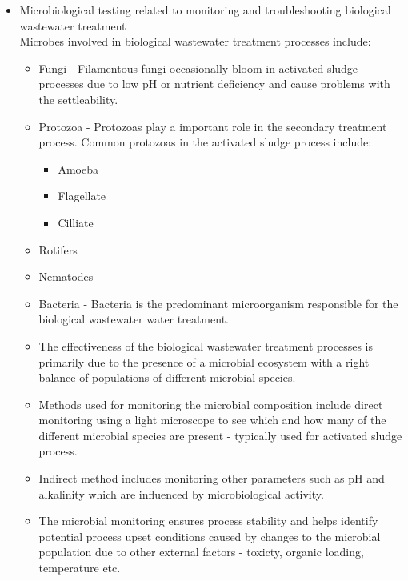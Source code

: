 \begin{itemize}
				
				\item Microbiological testing related to monitoring and troubleshooting biological wastewater treatment\\
				
				Microbes involved in biological wastewater treatment processes include:\\
				\begin{itemize}
					\item Fungi - Filamentous fungi occasionally bloom in activated sludge processes due to low pH or nutrient deficiency and cause problems with the settleability.
					\item Protozoa - Protozoas play a important role in the secondary treatment process.  Common protozoas in the activated sludge process include:
					      \begin{itemize}
					      	\item Amoeba
					      	\item Flagellate
					      	\item Cilliate
					      \end{itemize}
					\item Rotifers
					\item Nematodes
					\item Bacteria - Bacteria is the predominant microorganism responsible for the biological wastewater water treatment.  
				\end{itemize}
				\begin{itemize}
					\item The effectiveness of the biological wastewater treatment processes is primarily due to the presence of a microbial ecosystem with a right balance of populations of different microbial species.
					\item Methods used for monitoring the microbial composition include direct monitoring using a light microscope to see which and how many of the different microbial species are present - typically used for activated sludge process.
					\item Indirect method includes monitoring other parameters such as pH and alkalinity which are influenced by microbiological activity.
					\item The microbial monitoring ensures process stability and helps identify potential process upset conditions caused by changes to the microbial population due to other external factors - toxicty, organic loading, temperature etc.
				\end{itemize}


\end{itemize}

